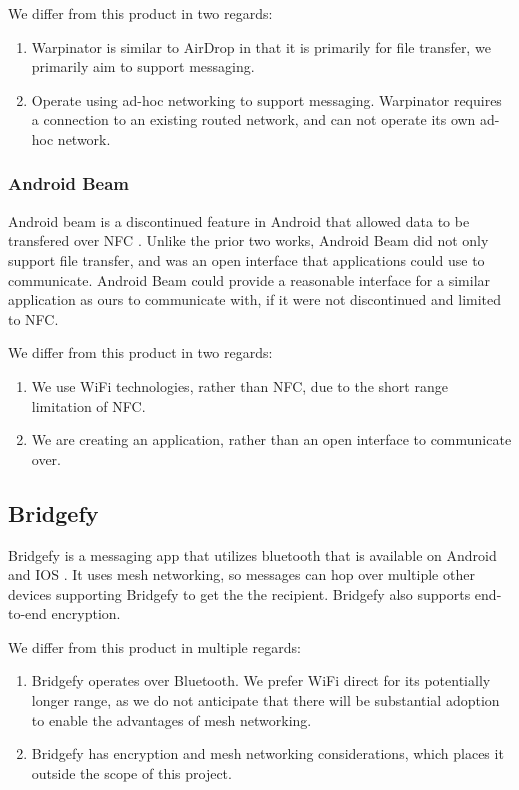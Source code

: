 \documentclass[10pt]{article}
\begin{document}
We differ from this product in two regards:

\begin{enumerate}
    \item Warpinator is similar to AirDrop in that it is primarily for file transfer, we primarily aim to support messaging.
    \item Operate using ad-hoc networking to support messaging. Warpinator requires a connection to an existing routed network, and can not operate its own ad-hoc network.
\end{enumerate}

\subsubsection{Android Beam}

Android beam is a discontinued \cite{Cantisano_2022} feature in Android that allowed data to be transfered over NFC \cite{AndroidDevelopers}. Unlike the prior two works, Android Beam did not only support file transfer, and was an open interface that applications could use to communicate. Android Beam could provide a reasonable interface for a similar application as ours to communicate with, if it were not discontinued and limited to NFC.

We differ from this product in two regards:

\begin{enumerate}
    \item We use WiFi technologies, rather than NFC, due to the short range limitation of NFC.
    \item We are creating an application, rather than an open interface to communicate over.
\end{enumerate}

\newpage

\subsection{Bridgefy}

Bridgefy is a messaging app that utilizes bluetooth that is available on Android and IOS \cite{Bridgefy}. It uses mesh networking, so messages can hop over multiple other devices supporting Bridgefy to get the the recipient. Bridgefy also supports end-to-end encryption.

We differ from this product in multiple regards:

\begin{enumerate}
    \item Bridgefy operates over Bluetooth. We prefer WiFi direct for its potentially longer range, as we do not anticipate that there will be substantial adoption to enable the advantages of mesh networking.
    \item Bridgefy has encryption and mesh networking considerations, which places it outside the scope of this project.
\end{enumerate}
\end{document}
